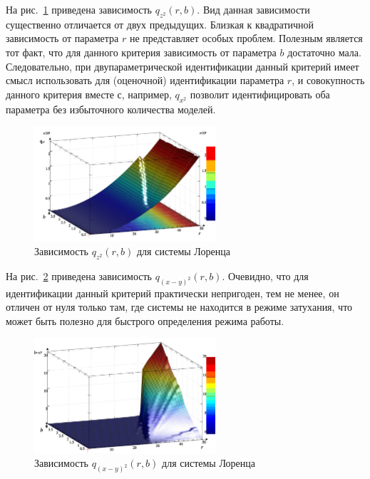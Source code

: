 На рис.~\ref{atu:f:lor_qz2_r_b} приведена зависимость
$q_{z^2}(r,b)$.
Вид данная зависимости существенно отличается от двух предыдущих.
Близкая к квадратичной зависимость от параметра $r$
не представляет особых проблем. Полезным является тот факт,
что для данного критерия зависимость от параметра $b$
достаточно мала. Следовательно, при двупараметрической идентификации
данный критерий имеет смысл  использовать для (оценочной)
идентификации параметра $r$, и совокупность данного критерия
вместе с, например, $q_{x^2}$ позволит идентифицировать
оба параметра без избыточного количества моделей.

\begin{figure}[ht!]
  \centerline{  \includegraphics[width=0.60\textwidth]{p/cha/lor/q2d/lor_qz2_r_b.png}  }
  \caption{Зависимость $q_{z^2}(r,b)$ для системы Лоренца}
  \label{atu:f:lor_qz2_r_b}
\end{figure}

На рис.~\ref{atu:f:lor_qxmy2_r_b} приведена зависимость
$q_{(x-y)^2}(r,b)$.
Очевидно, что для идентификации данный критерий
практически непригоден, тем не менее,
он отличен от нуля только там, где системы не
находится в режиме затухания, что может быть полезно
для быстрого определения режима работы.

\begin{figure}[ht!]
  \centerline{  \includegraphics[width=0.60\textwidth]{p/cha/lor/q2d/lor_qxmy2_r_b.png}  }
  \caption{Зависимость $q_{(x-y)^2}(r,b)$ для системы Лоренца}
  \label{atu:f:lor_qxmy2_r_b}
\end{figure}


